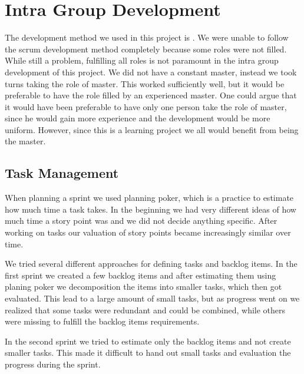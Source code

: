\section{Intra Group Development}
\label{sec:intragroupdev}
The development method we used in this project is \scrum{}.
We were unable to follow the scrum development method completely because some roles were not filled.
While still a problem, fulfilling all roles is not paramount in the intra group development of this project.
We did not have a constant \scrum{} master, instead we took turns taking the role of \scrum{} master.
This worked sufficiently well, but it would be preferable to have the role filled by an experienced \scrum{} master.
One could argue that it would have been preferable to have only one person take the role of \scrum{} master, since he would gain more experience and the development would be more uniform.
However, since this is a learning project we all would benefit from being the \scrum{} master.


\subsection{Task Management}
When planning a sprint we used planning poker, which is a \scrum{} practice to estimate how much time a task takes. 
In the beginning we had very different ideas of how much time a story point was and we did not decide anything specific. 
After working on tasks our valuation of story points became increasingly similar over time.

We tried several different approaches for defining tasks and backlog items. 
In the first sprint we created a few backlog items and after estimating them using planing poker we decomposition the items into smaller tasks, which then got evaluated. 
This lead to a large amount of small tasks, but as progress went on we realized that some tasks were redundant and could be combined, while others were missing to fulfill the backlog items requirements. 

In the second sprint we tried to estimate only the backlog items and not create smaller tasks. 
This made it difficult to hand out small tasks and evaluation the progress during the sprint. 

